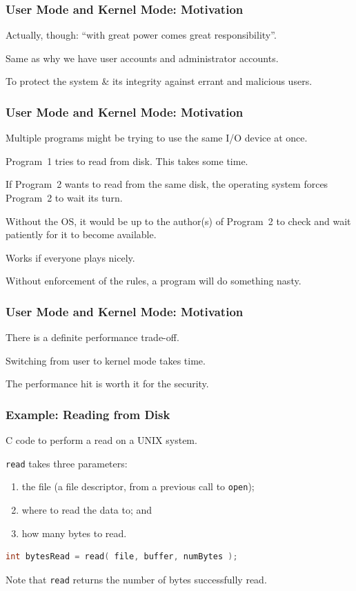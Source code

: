 \begin{frame}
	\frametitle{User Mode and Kernel Mode: Motivation}


	Actually, though: ``with great power comes great responsibility''.


	Same as why we have user accounts and administrator accounts.

	To protect the system \& its integrity against errant and malicious users.


\end{frame}

\begin{frame}
	\frametitle{User Mode and Kernel Mode: Motivation}

	Multiple programs might be trying to use the same I/O device at once.

	Program~1 tries to read from disk. This takes some time.

	If Program~2 wants to read from the same disk, the operating system forces Program~2 to wait its turn.

	Without the OS, it would be up to the author(s) of Program~2 to check and wait patiently for it to become available.

	Works if everyone plays nicely.

	Without enforcement of the rules, a program will do something nasty.

\end{frame}

\begin{frame}
	\frametitle{User Mode and Kernel Mode: Motivation}

	There is a definite performance trade-off.

	Switching from user to kernel mode takes time.

	The performance hit is worth it for the security.

\end{frame}

\begin{frame}[fragile]
	\frametitle{Example: Reading from Disk}
	C code to perform a read on a UNIX system.

	\texttt{read} takes three parameters:
	\begin{enumerate}
		\item the file (a file descriptor, from a previous call
		      to \texttt{open});
		\item where to read the data to; and
		\item how many bytes to read.
	\end{enumerate}

	\begin{lstlisting}[language=C]
int bytesRead = read( file, buffer, numBytes );
\end{lstlisting}

	Note that \texttt{read} returns the number of bytes successfully read.

\end{frame}


